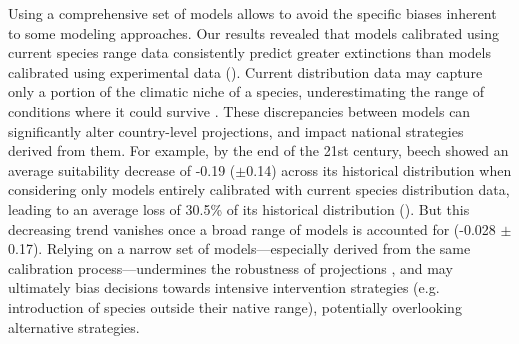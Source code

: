 \documentclass[11pt,letter]{article}
\begin{document}
Using a comprehensive set of models allows to avoid the specific biases inherent to some modeling approaches. Our results revealed that models calibrated using current species range data consistently predict greater extinctions than models calibrated using experimental data (). 
Current distribution data may capture only a portion of the climatic niche of a species, underestimating the range of conditions where it could survive \citep{Chevalier2024, NoguesBravo2016}.
These discrepancies between models can significantly alter country-level projections, and impact national strategies derived from them. 
For example, by the end of the 21st century, beech showed an average suitability decrease of -0.19 ($\pm$0.14) across its historical distribution when considering only models entirely calibrated with current species distribution data, leading to an average loss of 30.5\% of its historical distribution (). But this decreasing trend vanishes once a broad range of models is accounted for (-0.028 $\pm$0.17).
Relying on a narrow set of models---especially derived from the same calibration process---undermines the robustness of projections \citep{Dawson2011}, and may ultimately bias decisions towards intensive intervention strategies (e.g. introduction of species outside their native range), potentially overlooking alternative strategies.
\end{document}
